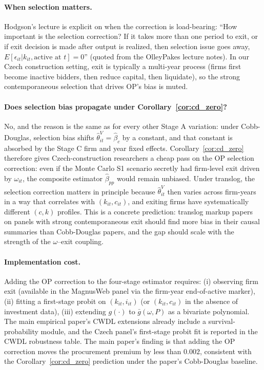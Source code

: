 \documentclass[11pt]{article}
\begin{document}
\paragraph{When selection matters.} Hodgson's lecture is explicit on when the correction is load-bearing: ``How important is the selection correction? If it takes more than one period to exit, or if exit decision is made after output is realized, then selection issue goes away, $E[\epsilon_{it}|k_{it}, \text{active at } t] = 0$'' (quoted from the OlleyPakes lecture notes). In our Czech construction setting, exit is typically a multi-year process (firms first become inactive bidders, then reduce capital, then liquidate), so the strong contemporaneous selection that drives OP's bias is muted.

\paragraph{Does selection bias propagate under Corollary~\ref{cor:cd_zero}?} No, and the reason is the same as for every other Stage A variation: under Cobb-Douglas, selection bias shifts $\hat\theta^V_{it} = \hat\beta_c$ by a constant, and that constant is absorbed by the Stage C firm and year fixed effects. Corollary~\ref{cor:cd_zero} therefore gives Czech-construction researchers a cheap pass on the OP selection correction: even if the Monte Carlo S1 scenario secretly had firm-level exit driven by $\omega_{it}$, the composite estimator $\hat\beta_{pp}$ would remain unbiased. Under translog, the selection correction matters in principle because $\hat\theta^V_{it}$ then varies across firm-years in a way that correlates with $(k_{it}, c_{it})$, and exiting firms have systematically different $(c,k)$ profiles. This is a concrete prediction: translog markup papers on panels with strong contemporaneous exit should find more bias in their causal summaries than Cobb-Douglas papers, and the gap should scale with the strength of the $\omega$--exit coupling.

\paragraph{Implementation cost.} Adding the OP correction to the four-stage estimator requires: (i) observing firm exit (available in the MagnusWeb panel via the firm-year end-of-active marker), (ii) fitting a first-stage probit on $(k_{it}, i_{it})$ (or $(k_{it}, c_{it})$ in the absence of investment data), (iii) extending $g(\cdot)$ to $\bar g(\omega, P)$ as a bivariate polynomial. The main empirical paper's CWDL extensions already include a survival-probability module, and the Czech panel's first-stage probit fit is reported in the CWDL robustness table. The main paper's finding is that adding the OP correction moves the procurement premium by less than $0.002$, consistent with the Corollary~\ref{cor:cd_zero} prediction under the paper's Cobb-Douglas baseline.
\end{document}
